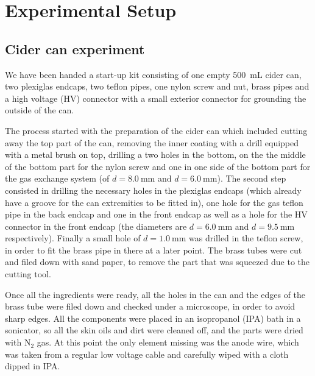 \section{Experimental Setup}
\subsection{Cider can experiment}
We have been handed a start-up kit consisting of one empty \SI{500}{\milli\liter}
cider can, two plexiglas endcaps, two teflon pipes, one nylon screw and nut,
brass pipes and a high voltage (HV) connector with a small exterior connector for
grounding the outside of the can.

The process started with the preparation of the cider can which included cutting
away the top part of the can, removing the inner coating with a drill equipped with a
metal brush on top, drilling a two holes in the bottom, on the the middle of the
bottom part for the nylon screw and one in one side of the bottom part for the
gas exchange system (of $d = \SI{8.0}{\milli\meter}$ and $d =
\SI{6.0}{\milli\meter}$). The second step consisted in drilling the necessary
holes in the plexiglas endcaps (which already have a groove for the can
extremities to be fitted in), one hole for the gas teflon pipe in the back
endcap and one in the front endcap as well as a hole for the HV connector in the
front endcap (the diameters are $d = \SI{6.0}{\milli\meter}$ and $d =
\SI{9.5}{\milli\meter}$ respectively). Finally a small hole of $d =
\SI{1.0}{\milli\meter}$ was drilled in the teflon screw, in order to fit the
brass pipe in there at a later point. The brass tubes were cut and filed down
with sand paper, to remove the part that was squeezed due to the cutting tool.

Once all the ingredients were ready, all the holes in the can and the edges of
the brass tube were filed down and checked under a microscope, in order to avoid
sharp edges. All the components were placed in an isopropanol (IPA) bath in a
sonicator, so all the skin oils and dirt were cleaned off, and the parts were
dried with $\mathrm{N}_2$ gas. At this point the only element missing was the
anode wire, which was taken from a regular low voltage cable and carefully wiped
with a cloth dipped in IPA.


